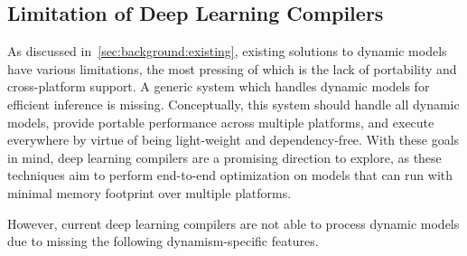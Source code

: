 \subsection{Limitation of Deep Learning Compilers}
\label{sec:background:dlc}
As discussed in~\ref{sec:background:existing}, existing solutions to dynamic models have various limitations, the most pressing of which is the lack of portability and cross-platform support.
A generic system which handles dynamic models for efficient inference is missing.
Conceptually, this system should handle all dynamic models, provide portable performance across multiple platforms, and execute everywhere by virtue of being light-weight and dependency-free.
With these goals in mind, deep learning compilers are a promising direction to explore, as these techniques aim to perform end-to-end optimization on models that can run with minimal memory footprint over multiple platforms.



However, current deep learning compilers are not able to process dynamic models due to missing the following dynamism-specific features.%

